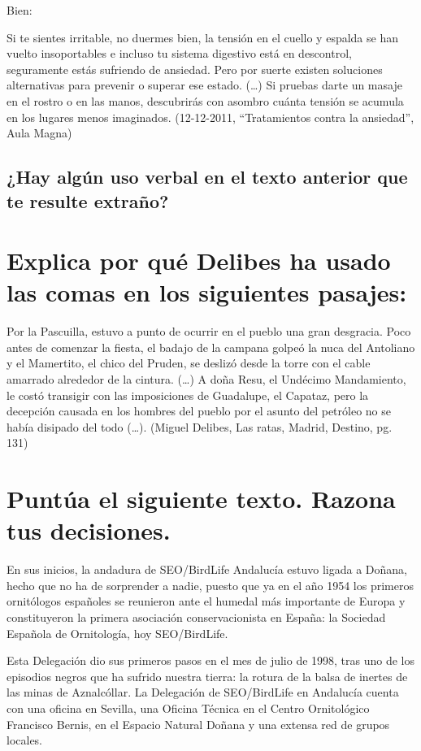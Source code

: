 \documentclass[12pt, a4paper, oneside]{report}
\begin{document}
    Bien:

    Si te sientes irritable, no duermes bien, la
    tensión en el cuello y espalda se han vuelto
    insoportables e incluso tu sistema digestivo está en
    descontrol, seguramente estás sufriendo de
    ansiedad. Pero por suerte existen soluciones
    alternativas para prevenir o superar ese estado.
    (…)
    Si pruebas darte un masaje en el rostro o en
    las manos, descubrirás con asombro cuánta tensión
    se acumula en los lugares menos imaginados.
    (12-12-2011, “Tratamientos contra la ansiedad”, Aula
    Magna)

    \subsection*{¿Hay algún uso verbal en el texto anterior que te resulte extraño?}


    \section{Explica por qué Delibes ha usado las comas en los siguientes pasajes:}

    Por la Pascuilla, estuvo a punto de ocurrir en el pueblo
    una gran desgracia. Poco antes de comenzar la ﬁesta, el
    badajo de la campana golpeó la nuca del Antoliano y el
    Mamertito, el chico del Pruden, se deslizó desde la torre con el
    cable amarrado alrededor de la cintura.
    (…)
    A doña Resu, el Undécimo Mandamiento, le costó
    transigir con las imposiciones de Guadalupe, el Capataz, pero
    la decepción causada en los hombres del pueblo por el asunto
    del petróleo no se había disipado del todo (…).
    (Miguel Delibes, Las ratas, Madrid, Destino, pg. 131)


    \section{Puntúa el siguiente texto. Razona tus decisiones.}
    En sus inicios, la andadura de SEO/BirdLife Andalucía estuvo ligada a Doñana, hecho que no ha de sorprender a
    nadie, puesto que ya en el año 1954 los primeros ornitólogos españoles se reunieron ante el humedal más importante
    de Europa y constituyeron la primera asociación conservacionista en España: la Sociedad Española de Ornitología, hoy
    SEO/BirdLife.

    Esta Delegación dio sus primeros pasos en el mes de julio de 1998, tras uno de los episodios negros que ha sufrido nuestra
    tierra: la rotura de la balsa de inertes de las minas de Aznalcóllar. La Delegación de SEO/BirdLife en Andalucía cuenta con una
    oﬁcina en Sevilla, una Oﬁcina Técnica en el Centro Ornitológico Francisco Bernis, en el Espacio Natural Doñana y una extensa red
    de grupos locales.
\end{document}
